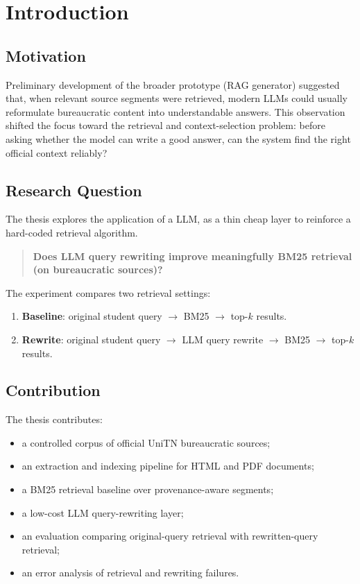 \chapter{Introduction}
\section{Motivation}
Preliminary development of the broader prototype (RAG generator) suggested that, when relevant source segments were retrieved, modern LLMs could usually reformulate bureaucratic content into understandable answers. This observation shifted the focus toward the retrieval and context-selection problem: before asking whether the model can write a good answer, can the system  find the right official context reliably?

\section{Research Question}
The thesis explores the application of a LLM, as a thin cheap layer to reinforce a hard-coded retrieval algorithm. 

\begin{quote}
\textbf{Does LLM query rewriting improve meaningfully BM25 retrieval (on bureaucratic sources)?}
\end{quote}

The experiment compares two retrieval settings:

\begin{enumerate}
    \item \textbf{Baseline}: original student query $\rightarrow$ BM25 $\rightarrow$ top-$k$ results.
    \item \textbf{Rewrite}: original student query $\rightarrow$ LLM query rewrite $\rightarrow$ BM25 $\rightarrow$ top-$k$ results.
\end{enumerate}

\section{Contribution}
The thesis contributes:
\begin{itemize}
    \item a controlled corpus of official UniTN bureaucratic sources;
    \item an extraction and indexing pipeline for HTML and PDF documents;
    \item a BM25 retrieval baseline over provenance-aware segments;
    \item a low-cost LLM query-rewriting layer;
    \item an evaluation comparing original-query retrieval with rewritten-query retrieval;
    \item an error analysis of retrieval and rewriting failures.
\end{itemize}
\par
